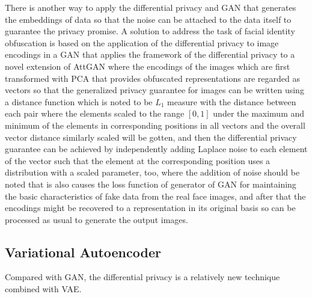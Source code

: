 \documentclass[conference]{IEEEtran}
\begin{document}
There is another way to apply the differential privacy and GAN that generates the embeddings of data so that the noise can be attached to the data itself to guarantee the privacy promise. A solution\cite{b45} to address the task of facial identity obfuscation is based on the application of the differential privacy to image encodings in a GAN that applies the framework of the differential privacy to a novel extension of AttGAN where the encodings of the images which are first transformed with PCA that provides obfuscated representations are regarded as vectors so that the generalized privacy guarantee for images can be written using a distance function which is noted to be $L_1$ measure with the distance between each pair where the elements scaled to the range $[0, 1]$ under the maximum and minimum of the elements in corresponding positions in all vectors and the overall vector distance similarly scaled will be gotten, and then the differential privacy guarantee can be achieved by independently adding Laplace noise to each element of the vector such that the element at the corresponding position uses a distribution with a scaled parameter, too, where the addition of noise should be noted that is also causes the loss function of generator of GAN for maintaining the basic characteristics of fake data from the real face images, and after that the encodings might be recovered to a representation in its original basis so can be processed as usual to generate the output images. 

\subsection{Variational Autoencoder}
Compared with GAN, the differential privacy is a relatively new technique combined with VAE.
\end{document}
